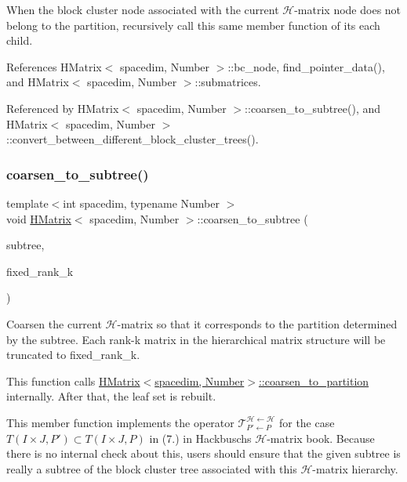 When the block cluster node associated with the current $\mathcal{H}$-\/matrix node does not belong to the {\ttfamily partition}, recursively call this same member function of its each child.

References H\+Matrix$<$ spacedim, Number $>$\+::bc\+\_\+node, find\+\_\+pointer\+\_\+data(), and H\+Matrix$<$ spacedim, Number $>$\+::submatrices.



Referenced by H\+Matrix$<$ spacedim, Number $>$\+::coarsen\+\_\+to\+\_\+subtree(), and H\+Matrix$<$ spacedim, Number $>$\+::convert\+\_\+between\+\_\+different\+\_\+block\+\_\+cluster\+\_\+trees().

\mbox{\label{classHMatrix_a27c7390b792e6e47ab2861616a997d99}} 
\subsubsection{\texorpdfstring{coarsen\+\_\+to\+\_\+subtree()}{coarsen\_to\_subtree()}}
{\footnotesize\ttfamily template$<$int spacedim, typename Number $>$ \\
void \hyperlink{classHMatrix}{H\+Matrix}$<$ spacedim, Number $>$\+::coarsen\+\_\+to\+\_\+subtree (\begin{DoxyParamCaption}\item[{const \hyperlink{classBlockClusterTree}{Block\+Cluster\+Tree}$<$ spacedim, Number $>$ \&}]{subtree,  }\item[{const unsigned int}]{fixed\+\_\+rank\+\_\+k }\end{DoxyParamCaption})}

Coarsen the current $\mathcal{H}$-\/matrix so that it corresponds to the partition determined by the {\ttfamily subtree}. Each rank-\/k matrix in the hierarchical matrix structure will be truncated to {\ttfamily fixed\+\_\+rank\+\_\+k}.

This function calls {\ttfamily \hyperlink{classHMatrix_a525ad4d453f4f496b98cccb341c8b60b}{H\+Matrix$<$spacedim, Number$>$\+::coarsen\+\_\+to\+\_\+partition}} internally. After that, the leaf set is rebuilt.

This member function implements the operator $\mathcal{T}_{P' \leftarrow P}^{\mathcal{H} \leftarrow \mathcal{H}}$ for the case $T(I \times J, P') \subset T(I \times J, P)$ in (7.) in Hackbusch\textquotesingle{}s $\mathcal{H}$-\/matrix book. Because there is no internal check about this, users should ensure that the given {\ttfamily subtree} is really a subtree of the block cluster tree associated with this $\mathcal{H}$-\/matrix hierarchy.


